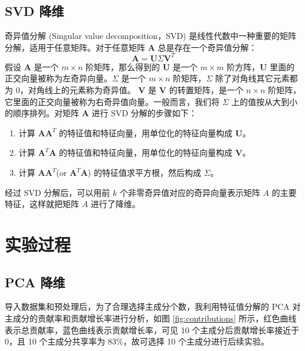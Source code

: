 \documentclass[12pt,AutoFakeBold]{article}
\begin{document}
\subsection{SVD 降维}

奇异值分解 (Singular value decomposition，SVD) 是线性代数中一种重要的矩阵分解，适用于任意矩阵。对于任意矩阵 $\bm{A}$ 总是存在一个奇异值分解：
%
\begin{equation}
\bm{A}=\bm{U}\Sigma \bm{V}^T
\end{equation}
%
假设 $\bm{A}$ 是一个 $m\times n$ 阶矩阵，那么得到的 $\bm{U}$ 是一个 $m\times m$ 阶方阵，$\bm{U}$ 里面的正交向量被称为左奇异向量。$\Sigma$ 是一个 $m\times n$ 阶矩阵，$\Sigma$ 除了对角线其它元素都为 0，对角线上的元素称为奇异值。 $\bm{V}$ 是 $\bm{V}$ 的转置矩阵，是一个 $n\times n$ 阶矩阵，它里面的正交向量被称为右奇异值向量。一般而言，我们将 $\Sigma$ 上的值按从大到小的顺序排列。对矩阵 $\bm{A}$ 进行 SVD 分解的步骤如下：

\begin{enumerate}
\renewcommand{\labelenumi}{\hspace{12pt} \bfseries \textit{Step} \theenumi.}

\item 计算 $\bm{A}\bm{A}^T$ 的特征值和特征向量，用单位化的特征向量构成 $\bm{U}$。

\item 计算 $\bm{A}^T\bm{A}$ 的特征值和特征向量，用单位化的特征向量构成 $\bm{V}$。

\item 计算 $\bm{A}\bm{A}^T$(or $\bm{A}^T\bm{A}$) 的特征值求平方根，然后构成 $\Sigma$。
\end{enumerate}

经过 SVD 分解后，可以用前 $k$ 个非零奇异值对应的奇异向量表示矩阵 $A$ 的主要特征，这样就把矩阵 $A$ 进行了降维。

\section{实验过程}

\subsection{PCA 降维}

导入数据集和预处理后，为了合理选择主成分个数，我利用特征值分解的 PCA 对主成分的贡献率和贡献增长率进行分析，如图 \ref{fig:contributions} 所示，红色曲线表示总贡献率，蓝色曲线表示贡献增长率，可见 10 个主成分后贡献增长率接近于 0，且 10 个主成分共享率为 83\%，故可选择 10 个主成分进行后续实验。
\end{document}
